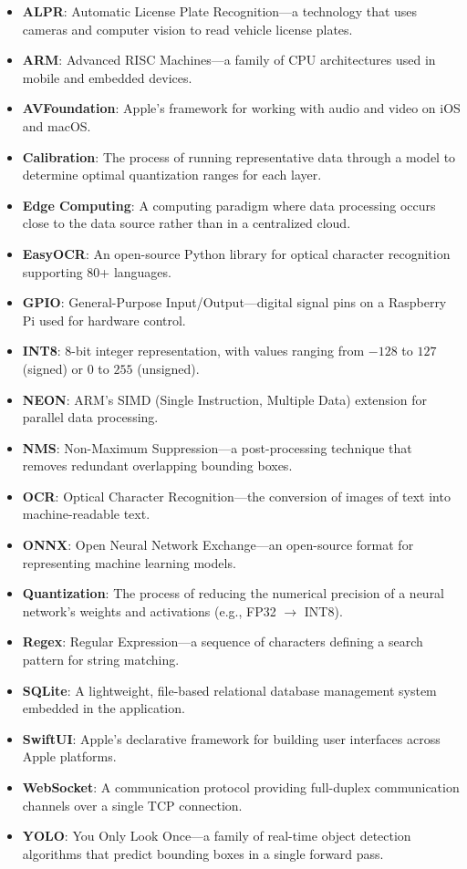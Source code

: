 \begin{itemize}
    \item \textbf{ALPR}: Automatic License Plate Recognition---a technology that uses cameras and computer vision to read vehicle license plates.
    \item \textbf{ARM}: Advanced RISC Machines---a family of CPU architectures used in mobile and embedded devices.
    \item \textbf{AVFoundation}: Apple's framework for working with audio and video on iOS and macOS.
    \item \textbf{Calibration}: The process of running representative data through a model to determine optimal quantization ranges for each layer.
    \item \textbf{Edge Computing}: A computing paradigm where data processing occurs close to the data source rather than in a centralized cloud.
    \item \textbf{EasyOCR}: An open-source Python library for optical character recognition supporting 80+ languages.
    \item \textbf{GPIO}: General-Purpose Input/Output---digital signal pins on a Raspberry Pi used for hardware control.
    \item \textbf{INT8}: 8-bit integer representation, with values ranging from $-128$ to $127$ (signed) or $0$ to $255$ (unsigned).
    \item \textbf{NEON}: ARM's SIMD (Single Instruction, Multiple Data) extension for parallel data processing.
    \item \textbf{NMS}: Non-Maximum Suppression---a post-processing technique that removes redundant overlapping bounding boxes.
    \item \textbf{OCR}: Optical Character Recognition---the conversion of images of text into machine-readable text.
    \item \textbf{ONNX}: Open Neural Network Exchange---an open-source format for representing machine learning models.
    \item \textbf{Quantization}: The process of reducing the numerical precision of a neural network's weights and activations (e.g., FP32 $\to$ INT8).
    \item \textbf{Regex}: Regular Expression---a sequence of characters defining a search pattern for string matching.
    \item \textbf{SQLite}: A lightweight, file-based relational database management system embedded in the application.
    \item \textbf{SwiftUI}: Apple's declarative framework for building user interfaces across Apple platforms.
    \item \textbf{WebSocket}: A communication protocol providing full-duplex communication channels over a single TCP connection.
    \item \textbf{YOLO}: You Only Look Once---a family of real-time object detection algorithms that predict bounding boxes in a single forward pass.
\end{itemize}


